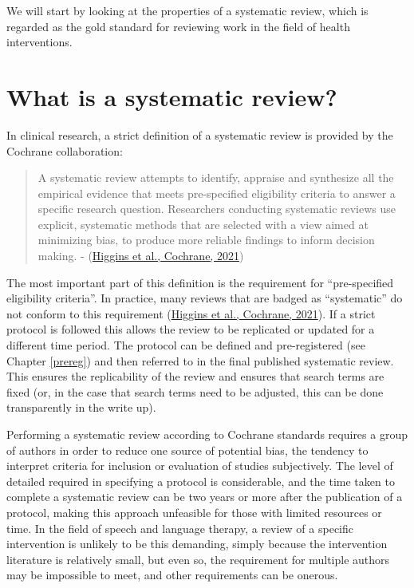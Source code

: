 \documentclass{krantz}
\begin{document}
We will start by looking at the properties of a systematic review, which is regarded as the gold standard for reviewing work in the field of health interventions.

\hypertarget{what-is-a-systematic-review}{%
\section{What is a systematic review?}\label{what-is-a-systematic-review}}

In clinical research, a strict definition of a systematic review is provided by the Cochrane collaboration:

\begin{quote}
A systematic review attempts to identify, appraise and synthesize all the empirical evidence that meets pre-specified eligibility criteria to answer a specific research question. Researchers conducting systematic reviews use explicit, systematic methods that are selected with a view aimed at minimizing bias, to produce more reliable findings to inform decision making. - (\protect\hyperlink{ref-higgins2021}{Higgins et al., Cochrane, 2021})
\end{quote}

The most important part of this definition is the requirement for ``pre-specified eligibility criteria''. In practice, many reviews that are badged as ``systematic'' do not conform to this requirement (\protect\hyperlink{ref-higgins2021}{Higgins et al., Cochrane, 2021}). If a strict protocol is followed this allows the review to be replicated or updated for a different time period. The protocol can be defined and pre-registered (see Chapter \ref{prereg}) and then referred to in the final published systematic review. This ensures the replicability of the review and ensures that search terms are fixed (or, in the case that search terms need to be adjusted, this can be done transparently in the write up).

Performing a systematic review according to Cochrane standards requires a group of authors in order to reduce one source of potential bias, the tendency to interpret criteria for inclusion or evaluation of studies subjectively. The level of detailed required in specifying a protocol is considerable, and the time taken to complete a systematic review can be two years or more after the publication of a protocol, making this approach unfeasible for those with limited resources or time. In the field of speech and language therapy, a review of a specific intervention is unlikely to be this demanding, simply because the intervention literature is relatively small, but even so, the requirement for multiple authors may be impossible to meet, and other requirements can be onerous.
\end{document}
